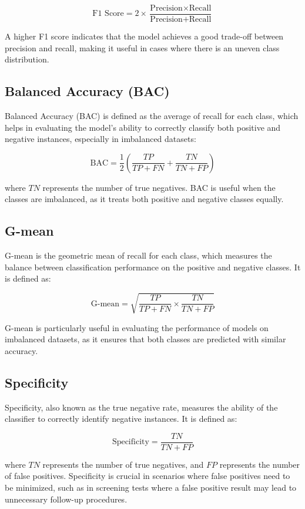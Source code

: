 \begin{equation}
\text{F1 Score} = 2 \times \frac{\text{Precision} \times \text{Recall}}{\text{Precision} + \text{Recall}}
\end{equation}

A higher F1 score indicates that the model achieves a good trade-off between precision and recall, making it useful in cases where there is an uneven class distribution.

\subsection{Balanced Accuracy (BAC)}
Balanced Accuracy (BAC) is defined as the average of recall for each class, which helps in evaluating the model's ability to correctly classify both positive and negative instances, especially in imbalanced datasets:

\begin{equation}
\text{BAC} = \frac{1}{2} \left( \frac{TP}{TP + FN} + \frac{TN}{TN + FP} \right)
\end{equation}

where $TN$ represents the number of true negatives. BAC is useful when the classes are imbalanced, as it treats both positive and negative classes equally.

\subsection{G-mean}
G-mean is the geometric mean of recall for each class, which measures the balance between classification performance on the positive and negative classes. It is defined as:

\begin{equation}
\text{G-mean} = \sqrt{\frac{TP}{TP + FN} \times \frac{TN}{TN + FP}}
\end{equation}

G-mean is particularly useful in evaluating the performance of models on imbalanced datasets, as it ensures that both classes are predicted with similar accuracy.

\subsection{Specificity}
Specificity, also known as the true negative rate, measures the ability of the classifier to correctly identify negative instances. It is defined as:

\begin{equation}
\text{Specificity} = \frac{TN}{TN + FP}
\end{equation}

where $TN$ represents the number of true negatives, and $FP$ represents the number of false positives. Specificity is crucial in scenarios where false positives need to be minimized, such as in screening tests where a false positive result may lead to unnecessary follow-up procedures.

